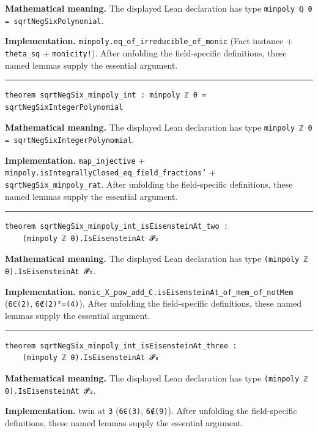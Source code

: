 \documentclass[UTF8,a4paper,11pt,fontset=fandol]{ctexart}
\theoremstyle{definition}
\newcommand{\statementsep}{\par\medskip\hrule\medskip}
\begin{document}
\noindent\textbf{Mathematical meaning.} The displayed Lean declaration has type \texttt{minpoly ℚ θ = sqrtNegSixPolynomial}.\par
\noindent\textbf{Implementation.} \texttt{minpoly.\allowbreak{}eq\_\allowbreak{}of\_\allowbreak{}irreducible\_\allowbreak{}of\_\allowbreak{}monic} (Fact instance + \texttt{theta\_\allowbreak{}sq} + \texttt{monicity!}). After unfolding the field-specific definitions, these named lemmas supply the essential argument.\par
\statementsep
\begin{verbatim}
theorem sqrtNegSix_minpoly_int : minpoly ℤ θ = sqrtNegSixIntegerPolynomial
\end{verbatim}
\noindent\textbf{Mathematical meaning.} The displayed Lean declaration has type \texttt{minpoly ℤ θ = sqrtNegSixIntegerPolynomial}.\par
\noindent\textbf{Implementation.} \texttt{map\_\allowbreak{}injective} + \texttt{minpoly.\allowbreak{}isIntegrallyClosed\_\allowbreak{}eq\_\allowbreak{}field\_\allowbreak{}fractions'} + \texttt{sqrtNegSix\_\allowbreak{}minpoly\_\allowbreak{}rat}. After unfolding the field-specific definitions, these named lemmas supply the essential argument.\par
\statementsep
\begin{verbatim}
theorem sqrtNegSix_minpoly_int_isEisensteinAt_two :
    (minpoly ℤ θ).IsEisensteinAt 𝓟₂
\end{verbatim}
\noindent\textbf{Mathematical meaning.} The displayed Lean declaration has type \texttt{(minpoly ℤ θ).\allowbreak{}IsEisensteinAt 𝓟₂}.\par
\noindent\textbf{Implementation.} \texttt{monic\_\allowbreak{}X\_\allowbreak{}pow\_\allowbreak{}add\_\allowbreak{}C.\allowbreak{}isEisensteinAt\_\allowbreak{}of\_\allowbreak{}mem\_\allowbreak{}of\_\allowbreak{}notMem} (\texttt{6∈(2)}, \texttt{6∉(2)²=(4)}). After unfolding the field-specific definitions, these named lemmas supply the essential argument.\par
\statementsep
\begin{verbatim}
theorem sqrtNegSix_minpoly_int_isEisensteinAt_three :
    (minpoly ℤ θ).IsEisensteinAt 𝓟₃
\end{verbatim}
\noindent\textbf{Mathematical meaning.} The displayed Lean declaration has type \texttt{(minpoly ℤ θ).\allowbreak{}IsEisensteinAt 𝓟₃}.\par
\noindent\textbf{Implementation.} twin at \texttt{3} (\texttt{6∈(3)}, \texttt{6∉(9)}). After unfolding the field-specific definitions, these named lemmas supply the essential argument.\par
\end{document}
